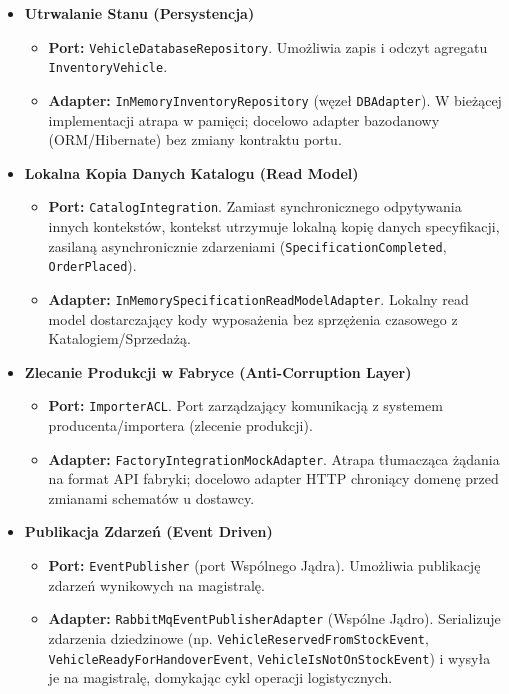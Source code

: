 \begin{itemize}
    \item \textbf{Utrwalanie Stanu (Persystencja)}
    \begin{itemize}
        \item \textbf{Port:} \texttt{VehicleDatabaseRepository}. Umożliwia zapis i odczyt agregatu \texttt{InventoryVehicle}.
        \item \textbf{Adapter:} \texttt{InMemoryInventoryRepository} (węzeł \texttt{DBAdapter}). W bieżącej implementacji atrapa w pamięci; docelowo adapter bazodanowy (ORM/Hibernate) bez zmiany kontraktu portu.
    \end{itemize}

    \item \textbf{Lokalna Kopia Danych Katalogu (Read Model)}
    \begin{itemize}
        \item \textbf{Port:} \texttt{CatalogIntegration}. Zamiast synchronicznego odpytywania innych kontekstów, kontekst utrzymuje lokalną kopię danych specyfikacji, zasilaną asynchronicznie zdarzeniami (\texttt{SpecificationCompleted}, \texttt{OrderPlaced}).
        \item \textbf{Adapter:} \texttt{InMemorySpecificationReadModelAdapter}. Lokalny read model dostarczający kody wyposażenia bez sprzężenia czasowego z Katalogiem/Sprzedażą.
    \end{itemize}

    \item \textbf{Zlecanie Produkcji w Fabryce (Anti-Corruption Layer)}
    \begin{itemize}
        \item \textbf{Port:} \texttt{ImporterACL}. Port zarządzający komunikacją z systemem producenta/importera (zlecenie produkcji).
        \item \textbf{Adapter:} \texttt{FactoryIntegrationMockAdapter}. Atrapa tłumacząca żądania na format API fabryki; docelowo adapter HTTP chroniący domenę przed zmianami schematów u dostawcy.
    \end{itemize}

    \item \textbf{Publikacja Zdarzeń (Event Driven)}
    \begin{itemize}
        \item \textbf{Port:} \texttt{EventPublisher} (port Wspólnego Jądra). Umożliwia publikację zdarzeń wynikowych na magistralę.
        \item \textbf{Adapter:} \texttt{RabbitMqEventPublisherAdapter} (Wspólne Jądro). Serializuje zdarzenia dziedzinowe (np. \texttt{VehicleReservedFromStockEvent}, \texttt{VehicleReadyForHandoverEvent}, \texttt{VehicleIsNotOnStockEvent}) i wysyła je na magistralę, domykając cykl operacji logistycznych.
    \end{itemize}
\end{itemize}

